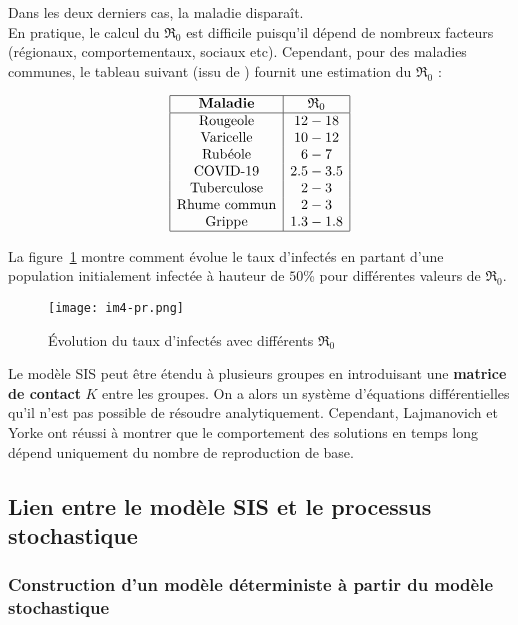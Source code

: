 \documentclass[a4paper,10.9pt]{article}
\newcommand{\R}{\mathfrak{R}_0}
\begin{document}
Dans les deux derniers cas, la maladie disparaît. \\

En pratique, le calcul du $\R$ est difficile puisqu'il dépend de nombreux facteurs (régionaux, comportementaux, sociaux etc). Cependant, pour des maladies communes, le tableau suivant (issu de \cite{R0}) fournit une estimation du $\R$ :

\[
\begin{array}{|c|c|}
\hline
\textbf{Maladie} & \R \\
\hline
\text{Rougeole} & 12 - 18 \\
\text{Varicelle} & 10 - 12 \\
\text{Rubéole} & 6 - 7 \\
\text{COVID-19} & 2.5 - 3.5 \\
\text{Tuberculose} & 2 - 3 \\
\text{Rhume commun} & 2 - 3 \\
\text{Grippe} & 1.3 - 1.8 \\
\hline
\end{array}
\]

La figure~\ref{fig:taux_inf} montre comment évolue le taux d'infectés en partant d'une population initialement infectée à hauteur de $50$\% pour différentes valeurs de $\R$.

\begin{figure}[h!]
  \centering
  \texttt{[image: im4-pr.png]} %
  \caption{Évolution du taux d'infectés avec différents $\mathfrak{R}_0$}
  \label{fig:taux_inf}
\end{figure}

Le modèle SIS peut être étendu à plusieurs groupes en introduisant une \textbf{matrice de contact} $K$ entre les groupes. On a alors un système d'équations différentielles qu'il n'est pas possible de résoudre analytiquement. Cependant, Lajmanovich et Yorke \cite{LajmanovichYorke} ont réussi à montrer que le comportement des solutions en temps long dépend uniquement du nombre de reproduction de base.

\subsection{Lien entre le modèle SIS et le processus stochastique}
\subsubsection{Construction d'un modèle déterministe à partir du modèle stochastique}
\end{document}
